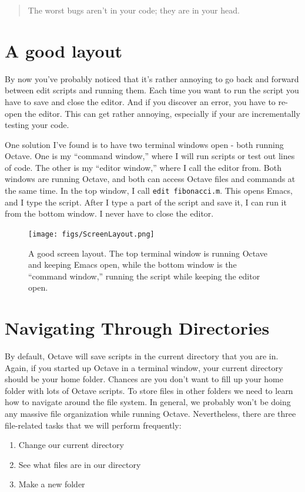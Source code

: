 \documentclass{book}
\begin{document}
\begin{quote}
The worst bugs aren't in your code; they are in your head.
\end{quote}

\section{A good layout}

By now you've probably noticed that it's rather annoying to go back and forward
between edit scripts and running them. Each time you want to run the script you
have to save and close the editor. And if you discover an error, you have to
re-open the editor. This can get rather annoying, especially if your are
incrementally testing your code.

One solution I've found is to have two terminal windows open - both running
Octave. One is my ``command window,'' where I will run scripts or test out
lines of code. The other is my ``editor window,'' where I call the editor from.
Both windows are running Octave, and both can access Octave files and
commands at the same time. In the top window, I call {\tt edit fibonacci.m}.
This opens Emacs, and I type the script. After I type a part of the script and
save it, I can run it from the bottom window. I never have to close the editor.

\begin{figure}
 \centerline{\texttt{[image: figs/ScreenLayout.png]}}
 \caption{A good screen layout. The top terminal window is running Octave and
keeping Emacs open, while the bottom window is the ``command window,'' running
the script while keeping the editor open.}
\end{figure}

\section{Navigating Through Directories}

By default, Octave will save scripts in the current directory that you are in.
Again, if you started up Octave in a terminal window, your current
directory should be your home folder. Chances are you don't want to fill up
your home folder with lots of Octave scripts. To store files in other folders
we need to learn how to navigate around the file system.
In general, we probably won't be doing any massive file organization
while running Octave. Nevertheless, there are three file-related tasks that
we will perform frequently:
%
\begin{enumerate}
 \item Change our current directory
 \item See what files are in our directory
 \item Make a new folder
\end{enumerate}
\end{document}

